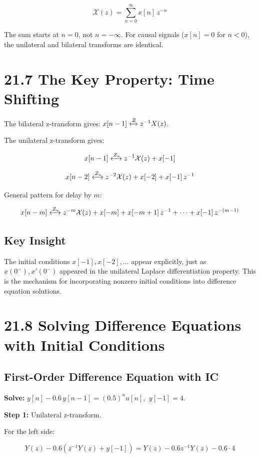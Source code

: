 \documentclass[11pt]{article}
\begin{document}
\[\mathcal{X}(z) = \sum_{n=0}^{\infty} x[n]\, z^{-n}\]

The sum starts at $n = 0$, not $n = -\infty$. For causal signals ($x[n] = 0$ for $n < 0$), the unilateral and bilateral transforms are identical.

\section*{21.7 The Key Property: Time Shifting}

The bilateral z-transform gives: $x[n-1] \xleftrightarrow{\mathcal{Z}} z^{-1} X(z)$.

The unilateral z-transform gives:

\[x[n-1] \xleftrightarrow{\mathcal{Z}_u} z^{-1} \mathcal{X}(z) + x[-1]\]

\[x[n-2] \xleftrightarrow{\mathcal{Z}_u} z^{-2} \mathcal{X}(z) + x[-2] + x[-1]\, z^{-1}\]

General pattern for delay by $m$:

\[x[n-m] \xleftrightarrow{\mathcal{Z}_u} z^{-m} \mathcal{X}(z) + x[-m] + x[-m+1]\, z^{-1} + \cdots + x[-1]\, z^{-(m-1)}\]

\subsection*{Key Insight}

The initial conditions $x[-1], x[-2], \ldots$ appear explicitly, just as $x(0^-), x'(0^-)$ appeared in the unilateral Laplace differentiation property. This is the mechanism for incorporating nonzero initial conditions into difference equation solutions.

\section*{21.8 Solving Difference Equations with Initial Conditions}

\subsection*{First-Order Difference Equation with IC}

\textbf{Solve:} $y[n] - 0.6\, y[n-1] = (0.5)^n u[n]$, $\ y[-1] = 4$.

\textbf{Step 1:} Unilateral z-transform.

For the left side:

\[Y(z) - 0.6\left(z^{-1} Y(z) + y[-1]\right) = Y(z) - 0.6 z^{-1} Y(z) - 0.6 \cdot 4\]
\end{document}
